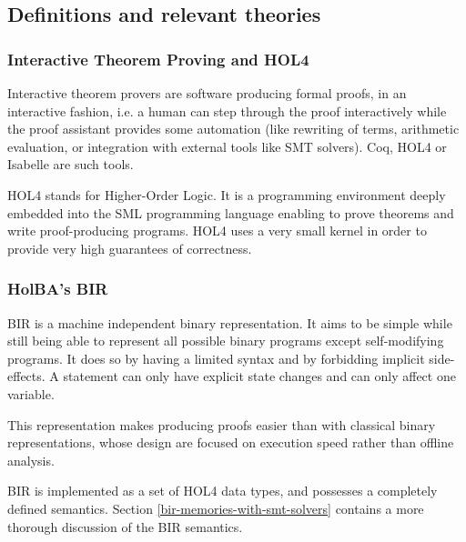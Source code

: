 \documentclass[10pt,a4paper]{article}
\begin{document}
\begin{multicols}{2}

\subsection{Definitions and relevant theories}

\subsubsection{Interactive Theorem Proving and HOL4} \label{hol4-presentation}

Interactive theorem provers are software producing formal proofs, in an
interactive fashion, i.e. a human can step through the proof interactively while the proof assistant provides some automation (like rewriting of terms, arithmetic evaluation, or integration with external tools like SMT solvers). Coq, HOL4 or Isabelle are such tools.

HOL4 stands for Higher-Order Logic. It is a programming environment deeply embedded into the {SML} programming language enabling to prove theorems and write {proof-producing} programs. HOL4 uses a very small kernel in order to provide very high guarantees of correctness.

\subsubsection{HolBA's BIR} \label{bir-presentation}

BIR is a machine independent binary representation. It aims to be simple while still being able to represent all possible binary programs except self-modifying programs. It does so by having a limited syntax and by forbidding implicit side-effects. A statement can only have explicit state changes and can only affect one variable.

This representation makes producing proofs easier than with classical binary representations, whose design are focused on execution speed rather than offline analysis.

BIR is implemented as a set of HOL4 data types, and possesses a completely defined semantics. Section \ref{bir-memories-with-smt-solvers} contains a more thorough discussion of the BIR semantics.


\end{multicols}
\end{document}
